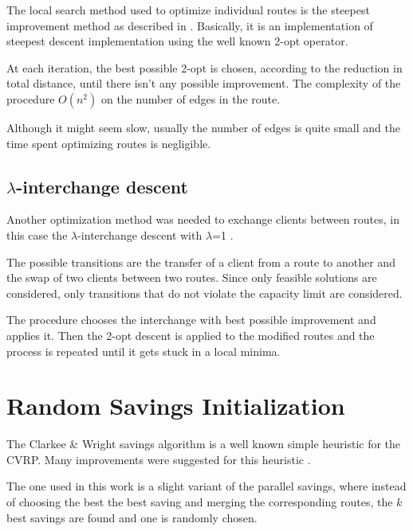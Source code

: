\documentclass{article} %
\begin{document}
The local search method used to optimize individual routes is the steepest improvement method as described in \citep{steepest_improvement}.
Basically, it is an implementation of steepest descent implementation using the well known 2-opt operator.\newline

At each iteration, the best possible 2-opt is chosen, according to the reduction in total distance, until there isn't any possible improvement. The complexity of the procedure $O(n^{2})$ on the number of edges in the route.\newline

Although it might seem slow, usually the number of edges is quite small and the time spent optimizing routes is negligible.\newline



\subsection{$\lambda$-interchange descent}
\label{local_cluster}
Another optimization method was needed to exchange clients between routes, in this case the $\lambda$-interchange descent with $\lambda$=1 \citep{osman1993}.\newline

The possible transitions are the transfer of a client from a route to another and the swap of two clients between two routes. Since only feasible solutions are considered, only transitions that do not violate the capacity limit are considered.\newline

The procedure chooses the interchange with best possible improvement and applies it. Then the 2-opt descent is applied to the modified routes and the process is repeated until it gets stuck in a local minima.


\newpage
\section{Random Savings Initialization}
\label{random_savings}
The Clarkee \& Wright savings algorithm is a well known simple heuristic for the CVRP.
Many improvements were suggested for this heuristic \cite{Clarkee_wright_ds}.\newline

The one used in this work is a slight variant of the parallel savings, where instead of choosing the best the best saving and merging the corresponding routes, the $k$ best savings are found and one is randomly chosen.\newline
\end{document}
